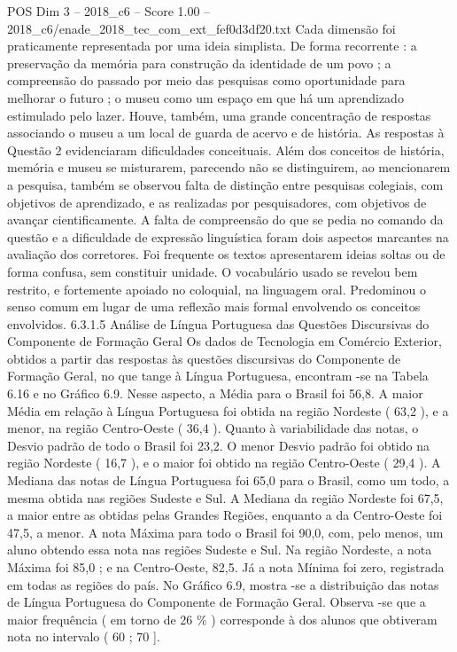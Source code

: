\begin{textsample}{POS Dim 3 – 2018\_c6 – Score 1.00 – 2018\_c6/enade\_2018\_tec\_com\_ext\_fef0d3df20.txt}
Cada dimensão foi praticamente representada por uma ideia simplista.
De forma recorrente : a preservação da memória para construção da identidade de um povo ; a compreensão do passado por meio das pesquisas como oportunidade para melhorar o futuro ; o museu como um espaço em que há um aprendizado estimulado pelo lazer.
Houve, também, uma grande concentração de respostas associando o museu a um local de guarda de acervo e de história.
As respostas à Questão 2 evidenciaram dificuldades conceituais.
Além dos conceitos de história, memória e museu se misturarem, parecendo não se distinguirem, ao mencionarem a pesquisa, também se observou falta de distinção entre pesquisas colegiais, com objetivos de aprendizado, e as realizadas por pesquisadores, com objetivos de avançar cientificamente.
A falta de compreensão do que se pedia no comando da questão e a dificuldade de expressão linguística foram dois aspectos marcantes na avaliação dos corretores.
Foi frequente os textos apresentarem ideias soltas ou de forma confusa, sem constituir unidade.
O vocabulário usado se revelou bem restrito, e fortemente apoiado no coloquial, na linguagem oral.
Predominou o senso comum em lugar de uma reflexão mais formal envolvendo os conceitos envolvidos. 6.3.1.5 Análise de Língua Portuguesa das Questões Discursivas do Componente de Formação Geral Os dados de Tecnologia em Comércio Exterior, obtidos a partir das respostas às questões discursivas do Componente de Formação Geral, no que tange à Língua Portuguesa, encontram -se na Tabela 6.16 e no Gráfico 6.9.
Nesse aspecto, a Média para o Brasil foi 56,8.
A maior Média em relação à Língua Portuguesa foi obtida na região Nordeste ( 63,2 ), e a menor, na região Centro-Oeste ( 36,4 ).
Quanto à variabilidade das notas, o Desvio padrão de todo o Brasil foi 23,2.
O menor Desvio padrão foi obtido na região Nordeste ( 16,7 ), e o maior foi obtido na região Centro-Oeste ( 29,4 ).
A Mediana das notas de Língua Portuguesa foi 65,0 para o Brasil, como um todo, a mesma obtida nas regiões Sudeste e Sul.
A Mediana da região Nordeste foi 67,5, a maior entre as obtidas pelas Grandes Regiões, enquanto a da Centro-Oeste foi 47,5, a menor.
A nota Máxima para todo o Brasil foi 90,0, com, pelo menos, um aluno obtendo essa nota nas regiões Sudeste e Sul.
Na região Nordeste, a nota Máxima foi 85,0 ; e na Centro-Oeste, 82,5.
Já a nota Mínima foi zero, registrada em todas as regiões do país.
No Gráfico 6.9, mostra -se a distribuição das notas de Língua Portuguesa do Componente de Formação Geral.
Observa -se que a maior frequência ( em torno de 26 \% ) corresponde à dos alunos que obtiveram nota no intervalo ( 60 ; 70 ].

\end{textsample}
